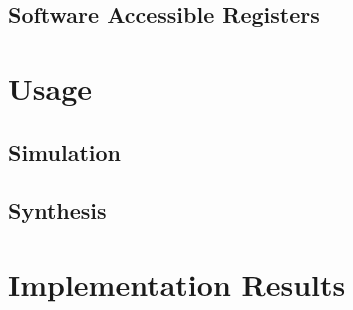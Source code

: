 \documentclass{\TEX/ug/ug}
\begin{document}
\ifdefined\SWREG
\subsection{Software Accessible Registers}
\label{sec:swreg}

\fi

\section{Usage}
\label{sec:inst}


\subsection{Simulation}
\label{sec:tbbd}


\subsection{Synthesis}
\label{sec:synth}


\ifdefined\RESULTS
\section{Implementation Results}
\label{sec:results}

\fi

\ifdefined\CUSTOM

\fi
\end{document}
